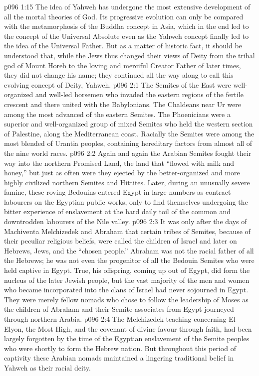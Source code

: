 \vs p096 1:15 The idea of Yahweh has undergone the most extensive development of all the mortal theories of God. Its progressive evolution can only be compared with the metamorphosis of the Buddha concept in Asia, which in the end led to the concept of the Universal Absolute even as the Yahweh concept finally led to the idea of the Universal Father. But as a matter of historic fact, it should be understood that, while the Jews thus changed their views of Deity from the tribal god of Mount Horeb to the loving and merciful Creator Father of later times, they did not change his name; they continued all the way along to call this evolving concept of Deity, Yahweh.
\vs p096 2:1 The Semites of the East were well\hyp{}organized and well\hyp{}led horsemen who invaded the eastern regions of the fertile crescent and there united with the Babylonians. The Chaldeans near Ur were among the most advanced of the eastern Semites. The Phoenicians were a superior and well\hyp{}organized group of mixed Semites who held the western section of Palestine, along the Mediterranean coast. Racially the Semites were among the most blended of Urantia peoples, containing hereditary factors from almost all of the nine world races.
\vs p096 2:2 Again and again the Arabian Semites fought their way into the northern Promised Land, the land that “flowed with milk and honey,” but just as often were they ejected by the better\hyp{}organized and more highly civilized northern Semites and Hittites. Later, during an unusually severe famine, these roving Bedouins entered Egypt in large numbers as contract labourers on the Egyptian public works, only to find themselves undergoing the bitter experience of enslavement at the hard daily toil of the common and downtrodden labourers of the Nile valley.
\vs p096 2:3 It was only after the days of Machiventa Melchizedek and Abraham that certain tribes of Semites, because of their peculiar religious beliefs, were called the children of Israel and later on Hebrews, Jews, and the “chosen people.” Abraham was not the racial father of all the Hebrews; he was not even the progenitor of all the Bedouin Semites who were held captive in Egypt. True, his offspring, coming up out of Egypt, did form the nucleus of the later Jewish people, but the vast majority of the men and women who became incorporated into the clans of Israel had never sojourned in Egypt. They were merely fellow nomads who chose to follow the leadership of Moses as the children of Abraham and their Semite associates from Egypt journeyed through northern Arabia.
\vs p096 2:4 \pc The Melchizedek teaching concerning El Elyon, the Most High, and the covenant of divine favour through faith, had been largely forgotten by the time of the Egyptian enslavement of the Semite peoples who were shortly to form the Hebrew nation. But throughout this period of captivity these Arabian nomads maintained a lingering traditional belief in Yahweh as their racial deity.
